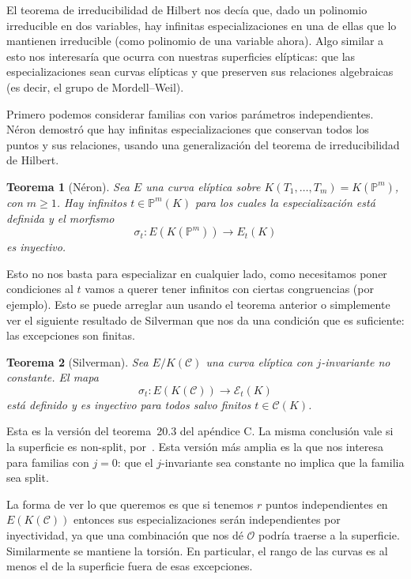 \documentclass[a4paper]{book}
\theoremstyle{definition}
\theoremstyle{plain}
\newtheorem*{theorem*}{Teorema}
\newcommand{\PP}{\mathbb{P}}
\newcommand{\OO}{\mathcal{O}}
\newcommand{\cc}{\mathcal{C}}
\newcommand{\ee}{\mathcal{E}}
\begin{document}
El teorema de irreducibilidad de Hilbert nos decía que, dado un polinomio irreducible en dos variables, hay infinitas especializaciones en una de ellas que lo mantienen irreducible (como polinomio de una variable ahora). Algo similar a esto nos interesaría que ocurra con nuestras superficies elípticas: que las especializaciones sean curvas elípticas y que preserven sus relaciones algebraicas (es decir, el grupo de Mordell--Weil). 

Primero podemos considerar familias con varios parámetros independientes. Néron demostró que hay infinitas especializaciones que conservan todos los puntos y sus relaciones, usando una generalización del teorema de irreducibilidad de Hilbert.

\begin{theorem*}[Néron]
Sea $E$ una curva elíptica sobre $K(T_1,\ldots,T_m)=K(\PP^m)$, con $m\geq1$. Hay infinitos $t\in\PP^m(K)$ para los cuales la especialización está definida y el morfismo
\[
\sigma_t:E(K(\PP^m))\longrightarrow E_t(K)
\]
es inyectivo.
\end{theorem*}

Esto no nos basta para especializar en cualquier lado, como necesitamos poner condiciones al $t$ vamos a querer tener infinitos con ciertas congruencias (por ejemplo). Esto se puede arreglar aun usando el teorema anterior o simplemente ver el siguiente resultado de Silverman que nos da una condición que es suficiente: las excepciones son finitas.

\begin{theorem*}[Silverman]
Sea $E/K(\cc)$ una curva elíptica con $j$-invariante no constante. El mapa
\[
\sigma_t:E(K(\cc))\longrightarrow\ee_t(K)
\]
está definido y es inyectivo para todos salvo finitos $t\in\cc(K)$.
\end{theorem*}

Esta es la versión del teorema~20.3 del apéndice C. La misma conclusión vale si la superficie es non-split, por~\cite[cap.~III, teorema~11.4]{SilvermanAdvanced}. Esta versión más amplia es la que nos interesa para familias con $j=0$: que el $j$-invariante sea constante no implica que la familia sea split.

La forma de ver lo que queremos es que si tenemos $r$ puntos independientes en $E(K(\cc))$ entonces sus especializaciones serán independientes por inyectividad, ya que una combinación que nos dé $\OO$ podría traerse a la superficie. Similarmente se mantiene la torsión. En particular, el rango de las curvas es al menos el de la superficie fuera de esas excepciones.
\end{document}
